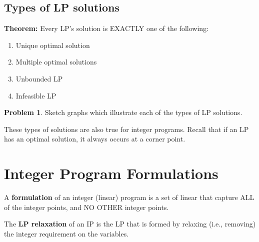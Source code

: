 \documentclass[11pt]{article}
\theoremstyle{definition}
\newtheorem{problem}{Problem}
\newcommand{\answerbox}[3]{%
  \fbox{%
    \begin{minipage}[#1]{#2}
      \hfill\vspace{#3}
    \end{minipage}
  }
}
\newcommand{\wordbox}{\answerbox{c}{1.2in}{.7cm}}
\begin{document}
\subsection{Types of LP solutions}

\textbf{Theorem:} Every LP's solution is EXACTLY one of the following:
	\begin{enumerate}
	\item Unique optimal solution
	\item Multiple optimal solutions
	\item Unbounded LP
	\item Infeasible LP
	\end{enumerate}

\begin{problem}
Sketch graphs which illustrate each of the types of LP solutions.
\end{problem}

\vfill

\begin{tcolorbox}
These types of solutions are also true for integer programs. Recall that if an LP has an optimal solution, it always occurs at a corner point.
\end{tcolorbox}

\newpage

\section{Integer Program Formulations}

\begin{tcolorbox}
A \textbf{formulation} of an integer (linear) program is a set of linear \wordbox that capture ALL of the \wordbox integer points, and NO OTHER integer points.
\end{tcolorbox}

\vfill

\begin{tcolorbox}
The \textbf{LP relaxation} of an IP is the LP that is formed by relaxing (i.e., removing) the integer requirement on the variables.
\end{tcolorbox}
\end{document}
